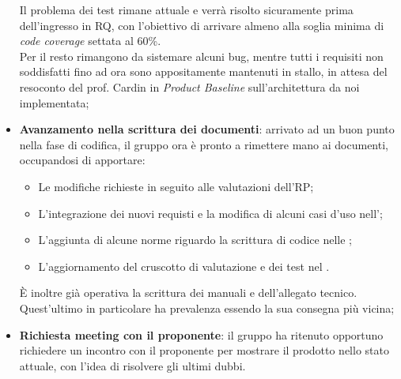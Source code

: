 \begin{itemize}
\begin{itemize}
	\end{itemize}
	Il problema dei test rimane attuale e verrà risolto sicuramente prima dell'ingresso in RQ, con l'obiettivo di arrivare almeno alla soglia minima di \textit{code coverage} settata al 60\%. \\
	Per il resto rimangono da sistemare alcuni bug, mentre tutti i requisiti non soddisfatti fino ad ora sono appositamente mantenuti in stallo, in attesa del resoconto del prof. Cardin in \textit{Product Baseline} sull'architettura da noi implementata;
	\item \textbf{Avanzamento nella scrittura dei documenti}: arrivato ad un buon punto nella fase di codifica, il gruppo ora è pronto a rimettere mano ai documenti, occupandosi di apportare:
	\begin{itemize}
		\item Le modifiche richieste in seguito alle valutazioni dell'RP;
		\item L'integrazione dei nuovi requisti e la modifica di alcuni casi d'uso nell'\AdRv{};
		\item L'aggiunta di alcune norme riguardo la scrittura di codice nelle \NdP{};
		\item L'aggiornamento del cruscotto di valutazione e dei test nel \PdQv{}.
	\end{itemize}	  
	È inoltre già operativa la scrittura dei manuali e dell'allegato tecnico. Quest'ultimo in particolare ha prevalenza essendo la sua consegna più vicina;
	\item \textbf{Richiesta meeting con il proponente}: il gruppo ha ritenuto opportuno richiedere un incontro con il proponente per mostrare il prodotto nello stato attuale, con l'idea di risolvere gli ultimi dubbi. 
\end{itemize}
